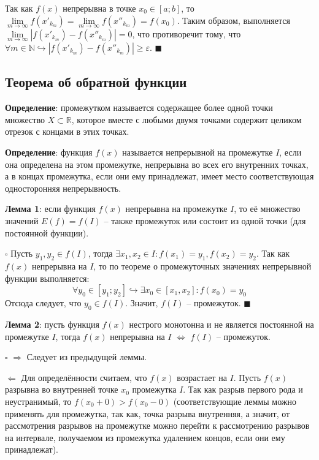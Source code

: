 \documentclass[12pt, a4paper, reqno]{article}
\begin{document}
    Так как $f(x)$ непрерывна в точке $x_0\in[a; b]$, то $\lim\limits_{m\to\infty} f(x'_{k_m}) =
    \lim\limits_{m\to\infty} f(x''_{k_m}) = f(x_0)$. Таким образом, выполняется
    $\lim\limits_{m\to\infty} |f(x'_{k_m}) - f(x''_{k_m})| = 0$, что противоречит тому, что
    $\forall m\in\mathbb{N}\hookrightarrow |f(x'_{k_m}) - f(x''_{k_m})| \geq \varepsilon$.
    $\blacksquare$

\subsection{Теорема об обратной функции}

    \textbf{Определение}: промежутком называется содержащее более одной точки множество
    $X\subset\mathbb{R}$, которое вместе с любыми двумя точками содержит целиком отрезок с концами в
    этих точках.

    \textbf{Определение}: функция $f(x)$ называется непрерывной на промежутке $I$, если она
    определена на этом промежутке, непрерывна во всех его внутренних точках, а в концах промежутка,
    если они ему принадлежат, имеет место соответствующая односторонняя непрерывность.

    \textbf{Лемма 1}: если функция $f(x)$ непрерывна на промежутке $I$, то её множество значений
    $E(f) = f(I)$ -- также промежуток или состоит из одной точки (для постоянной функции).

    $\square$ Пусть $y_1, y_2\in f(I)$, тогда $\exists x_1, x_2\in I: f(x_1) = y_1, f(x_2) = y_2$.
    Так как $f(x)$ непрерывна на $I$, то по теореме о промежуточных значениях непрерывной функции
    выполняется:
    \begin{equation*}
        \forall y_0\in[y_1; y_2]\hookrightarrow \exists x_0\in[x_1, x_2]: f(x_0) = y_0
    \end{equation*}
    Отсюда следует, что $y_0\in f(I)$. Значит, $f(I)$ -- промежуток. $\blacksquare$

    \textbf{Лемма 2}: пусть функция $f(x)$ нестрого монотонна и не является постоянной на промежутке
    $I$, тогда $f(x)$ непрерывна на $I$ $\iff$ $f(I)$ -- промежуток.

    $\square$ $\boxed{\Rightarrow}$ Следует из предыдущей леммы.

    $\boxed{\Leftarrow}$ Для определённости считаем, что $f(x)$ возрастает на $I$. Пусть $f(x)$
    разрывна во внутренней точке $x_0$ промежутка $I$. Так как разрыв первого рода и неустранимый,
    то $f(x_0 + 0) > f(x_0 - 0)$ (соответствующие леммы можно применять для промежутка, так как,
    точка разрыва внутренняя, а значит, от рассмотрения разрывов на промежутке можно перейти к
    рассмотрению разрывов на интервале, получаемом из промежутка удалением  концов, если они ему
    принадлежат).
\end{document}
